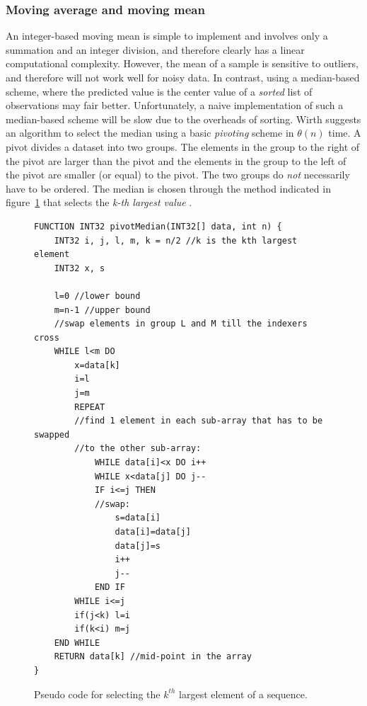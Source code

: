  \subsubsection{Moving average and moving mean}
  An integer-based moving mean is simple to implement and involves only a summation and an integer division, and therefore clearly has a linear computational complexity.
  However, the mean of a sample is sensitive to outliers, and therefore will not work well for noisy data. In contrast, using a median-based scheme,
  where the predicted value is the center value of a \textit{sorted} list of observations may fair better. Unfortunately, a naive implementation of such a 
  median-based scheme will be slow due to the overheads of sorting. Wirth \cite{wirth76} suggests an algorithm to select the median using a basic \textit{pivoting} 
  scheme in $\theta(n)$ time. A pivot divides a dataset into two groups. The elements in the group to the right of the pivot are larger than the pivot and the elements in the group to
  the left of the pivot are smaller (or equal) to the pivot. The two groups do \emph{not} necessarily have to be ordered. The median is chosen through the
  method indicated in figure~\ref{KTH_LARGEST} that selects the \textit{k-th largest value} \cite{wirth76}.
\begin{figure}[ht!]
\begin{mdframed}
\begin{verbatim}
FUNCTION INT32 pivotMedian(INT32[] data, int n) {
    INT32 i, j, l, m, k = n/2 //k is the kth largest element
    INT32 x, s

    l=0 //lower bound
    m=n-1 //upper bound
    //swap elements in group L and M till the indexers cross
    WHILE l<m DO 
        x=data[k]
        i=l
        j=m
        REPEAT
	    //find 1 element in each sub-array that has to be swapped
	    //to the other sub-array:
            WHILE data[i]<x DO i++
            WHILE x<data[j] DO j--
            IF i<=j THEN
		    //swap:
                s=data[i]
                data[i]=data[j]
                data[j]=s
                i++
                j--
            END IF
        WHILE i<=j
        if(j<k) l=i
        if(k<i) m=j
    END WHILE
    RETURN data[k] //mid-point in the array
}
  \end{verbatim}
\caption[Pseudo code for selecting the $k^{th}$ largest element of a sequence.]{Pseudo code for selecting the $k^{th}$ largest element of a sequence.}
\label{KTH_LARGEST}
\end{mdframed}
\end{figure}
